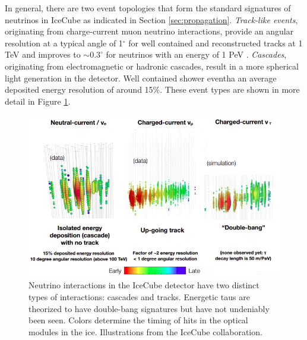 In general, there are two event topologies that form the standard signatures of neutrinos in IceCube as indicated in Section \ref{sec:propagation}. \textit{Track-like events}, originating from charge-current muon neutrino interactions, provide an angular resolution at a typical angle of 1$^\circ$ for well contained and reconstructed tracks at 1 TeV and improves to $\sim 0.3^\circ$ for neutrinos with an energy of 1 PeV \cite{Search for steady point-like sources in the astrophysical muon neutrino flux with 8 years of IceCube data Nog niet gepubliceerd}. \textit{Cascades}, originating from electromagnetic or hadronic cascades, result in a more spherical light generation in the detector. Well contained shower eventha an average deposited energy resolution of around 15\%. These event types are shown in more detail in Figure \ref{fig:ICinteractions2}.
 
\begin{figure}
\centering
\includegraphics[width=\textwidth]{chapter4/img/ICinteractions2.png}
\caption{Neutrino interactions in the IceCube detector have two distinct types of interactions: cascades and tracks. Energetic taus are theorized to have double-bang signatures but have not undeniably been seen. Colors determine the timing of hits in the optical modules in the ice. Illustrations from the IceCube collaboration.}
\label{fig:ICinteractions2}
\end{figure}
 

